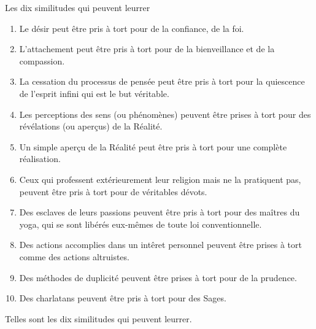 \documentclass[10pt]{book}
\makeatletter
\renewcommand{\section}{\@startsection{section}{0}{0mm}
   {\baselineskip}
   {\baselineskip}{\normalfont\normalsize\scshape\centering}
}
\makeatother
\begin{document}
\section{Les dix similitudes qui peuvent leurrer}
\begin{enumerate}[1.-]
\item Le désir peut être pris à tort pour de la confiance, de la foi.
\item L'attachement peut être pris à tort pour de la bienveillance et de la compassion.
\item La cessation du processus de pensée peut être pris à tort pour la quiescence de l'esprit infini qui est le but véritable.
\item Les perceptions des sens (ou phénomènes) peuvent être prises à tort pour des révélations (ou aperçus) de la Réalité.
\item Un simple aperçu de la Réalité peut être pris à tort pour une complète réalisation.
\item Ceux qui professent extérieurement leur religion mais ne la pratiquent pas, peuvent être pris à tort pour de véritables dévots.
\item Des esclaves de leurs passions peuvent être pris à tort pour des maîtres du yoga, qui se sont libérés eux-mêmes de toute loi conventionnelle.
\item Des actions accomplies dans un intêret personnel peuvent être prises à tort comme des actions altruistes.
\item Des méthodes de duplicité peuvent être prises à tort pour de la prudence.
\item Des charlatans peuvent être pris à tort pour des Sages.
\end{enumerate}
Telles sont les dix similitudes qui peuvent leurrer.
\end{document}
